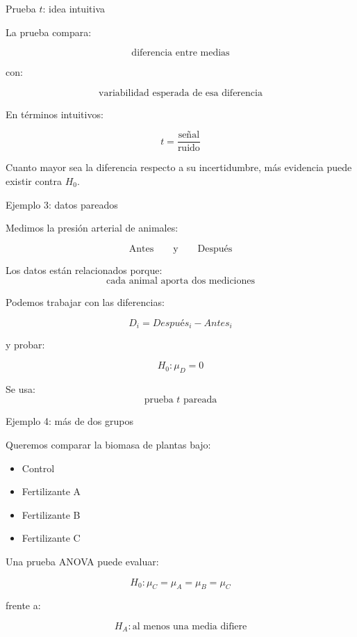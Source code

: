 \documentclass[11pt, aspectratio=169]{beamer}
\begin{document}
\begin{frame}{Prueba $t$: idea intuitiva}

La prueba compara:

\[
\text{diferencia entre medias}
\]

con:

\[
\text{variabilidad esperada de esa diferencia}
\]

En términos intuitivos:

\[
t=
\frac{\text{señal}}
{\text{ruido}}
\]

\pause

Cuanto mayor sea la diferencia respecto a su incertidumbre,
más evidencia puede existir contra $H_0$.

\end{frame}

\begin{frame}{Ejemplo 3: datos pareados}

Medimos la presión arterial de animales:

\[
\text{Antes}
\qquad\text{y}\qquad
\text{Después}
\]

Los datos están relacionados porque:
\vspace{-.5em}
\[
\boxed{\text{cada animal aporta dos mediciones}}
\]

Podemos trabajar con las diferencias:

\[
D_i=Después_i-Antes_i
\]

y probar:

\[
H_0:\mu_D=0
\]

Se usa:
\[
\boxed{\text{prueba }t\text{ pareada}}
\]


\end{frame}

\begin{frame}{Ejemplo 4: más de dos grupos}

Queremos comparar la biomasa de plantas bajo:

\begin{itemize}
    \item Control
    \item Fertilizante A
    \item Fertilizante B
    \item Fertilizante C
\end{itemize}

Una prueba ANOVA puede evaluar:

\[
H_0:
\mu_C=\mu_A=\mu_B=\mu_C
\]

frente a:

\[
H_A:\text{al menos una media difiere}
\]

\end{frame}

\end{document}
